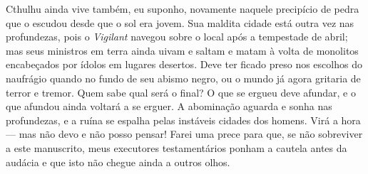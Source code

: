 Cthulhu ainda vive também, eu suponho, novamente naquele precipício de
pedra que o escudou desde que o sol era jovem. Sua maldita cidade está
outra vez nas profundezas, pois o \emph{Vigilant} navegou sobre o local
após a tempestade de abril; mas seus ministros em terra ainda uivam e
saltam e matam à volta de monolitos encabeçados por ídolos em lugares
desertos. Deve ter ficado preso nos escolhos do naufrágio quando no
fundo de seu abismo negro, ou o mundo já agora gritaria de terror e
tremor. Quem sabe qual será o final? O que se ergueu deve afundar, e o
que afundou ainda voltará a se erguer. A abominação aguarda e sonha nas
profundezas, e a ruína se espalha pelas instáveis cidades dos homens.
Virá a hora --- mas não devo e não posso pensar! Farei uma prece para
que, se não sobreviver a este manuscrito, meus executores testamentários
ponham a cautela antes da audácia e que isto não chegue ainda a outros
olhos.


